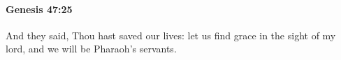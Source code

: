 
		\paragraph{Genesis 47:25} %
			\label{GENESIS-47-25}

			And they said, Thou hast saved our lives: let us find grace in the sight of my lord, and we will be Pharaoh's servants.


